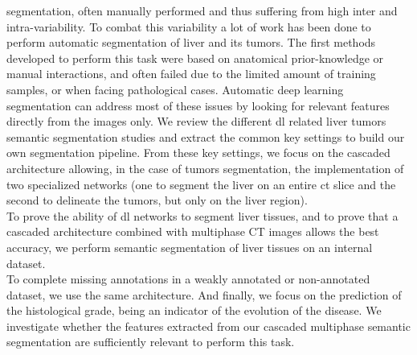 segmentation, often manually performed and thus suffering from high
inter and intra-variability.
To combat this variability a lot of work has been done to perform
automatic segmentation of liver and its tumors.
The first methods developed to perform this task were based on
anatomical prior-knowledge or manual interactions, and often failed due to 
the limited amount of training samples, or when
facing pathological cases.
Automatic deep learning segmentation can address most of these issues by
looking for relevant features directly from the images only.
We review the different \ac{dl} related liver tumors semantic segmentation
studies and extract the common key settings to build our own segmentation pipeline.
From these key settings, we focus on the cascaded architecture allowing,
in the case of tumors segmentation, the implementation of two specialized
networks (one to segment the liver on an entire \ac{ct} slice and the second to delineate the
tumors, but only on the liver region).\\
To prove the ability of \ac{dl} networks to segment liver tissues, and to
prove that a cascaded architecture combined with multiphase CT images
allows the best accuracy, we perform semantic segmentation of liver
tissues on an internal dataset.\\
To complete missing annotations in a weakly annotated or non-annotated
dataset, we use the same architecture.
And finally, we focus on the prediction of the histological grade, being
an indicator of the evolution of the disease. We investigate whether the
features extracted from our cascaded multiphase semantic segmentation
are sufficiently relevant to perform this task.
